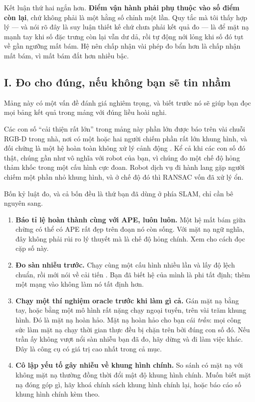 \documentclass[../../deep_learning.tex]{subfiles}
\begin{document}
Kết luận thứ hai ngắn hơn. \textbf{Điểm vận hành phải phụ thuộc vào số điểm còn lại}, chứ không phải là một hằng số chỉnh một lần. Quy tắc mà tôi thấy hợp lý --- và nói rõ đây là suy luận thiết kế chứ chưa phải kết quả đo --- là để mặt nạ mạnh tay khi số đặc trưng còn lại vẫn dư dả, rồi tự động nới lỏng khi số đó tụt về gần ngưỡng mất bám. Hệ nên chấp nhận vài phép đo bẩn hơn là chấp nhận mất bám, vì mất bám đắt hơn nhiều bậc.

\subsection{I. Đo cho đúng, nếu không bạn sẽ tin nhầm}
Mảng này có một vấn đề đánh giá nghiêm trọng, và biết trước nó sẽ giúp bạn đọc mọi bảng kết quả trong mảng với đúng liều hoài nghi.

Các con số ``cải thiện rất lớn'' trong mảng này phần lớn được báo trên vài chuỗi RGB-D trong nhà, nơi có một hoặc hai người chiếm phần rất lớn khung hình, và đối chứng là một hệ hoàn toàn không xử lý cảnh động \cite{sturm2012benchmark}. Kể cả khi các con số đó thật, chúng gần như vô nghĩa với robot của bạn, vì chúng đo một chế độ hỏng thảm khốc trong một cấu hình cực đoan. Robot dịch vụ đi hành lang gặp người chiếm một phần nhỏ khung hình, và ở chế độ đó thì RANSAC vốn đã xử lý ổn.

Bốn kỷ luật đo, và cả bốn đều là thứ bạn đã dùng ở phía SLAM, chỉ cần bê nguyên sang.

\begin{enumerate}
\item \textbf{Báo tỉ lệ hoàn thành cùng với APE, luôn luôn.} Một hệ mất bám giữa chừng có thể có APE rất đẹp trên đoạn nó còn sống. Với mặt nạ ngữ nghĩa, đây không phải rủi ro lý thuyết mà là chế độ hỏng chính. Xem  cho cách đọc cặp số này.
\item \textbf{Đo sàn nhiễu trước.} Chạy cùng một cấu hình nhiều lần và lấy độ lệch chuẩn, rồi mới nói về cải tiến \cite{bergstra2012random}. Bạn đã biết hệ của mình là phi tất định; thêm một mạng vào không làm nó tất định hơn.
\item \textbf{Chạy một thí nghiệm oracle trước khi làm gì cả.} Gán mặt nạ bằng tay, hoặc bằng một mô hình rất nặng chạy ngoại tuyến, trên vài trăm khung hình. Đó là mặt nạ hoàn hảo. Mặt nạ hoàn hảo cho bạn cái \emph{trần}: mọi công sức làm mặt nạ chạy thời gian thực đều bị chặn trên bởi đúng con số đó. Nếu trần ấy không vượt nổi sàn nhiễu bạn đã đo, hãy dừng và đi làm việc khác. Đây là công cụ có giá trị cao nhất trong cả mục.
\item \textbf{Cô lập yếu tố gây nhiễu về khung hình chính.} So sánh có mặt nạ với không mặt nạ thường đồng thời đổi mật độ khung hình chính. Muốn biết mặt nạ đóng góp gì, hãy khoá chính sách khung hình chính lại, hoặc báo cáo số khung hình chính kèm theo.
\end{enumerate}
\end{document}
